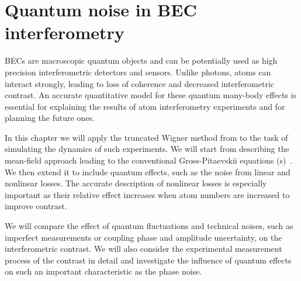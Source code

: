 \chapter{Quantum noise in BEC interferometry}
\label{cha:bec-noise}

BECs are macroscopic quantum objects and can be potentially used as high precision interferometric detectors and sensors.
Unlike photons, atoms can interact strongly, leading to loss of coherence and decreased interferometric contrast.
An accurate quantitative model for these quantum many-body effects is essential for explaining the results of atom interferometry experiments and for planning the future ones.

In this chapter we will apply the truncated Wigner method from  to the task of simulating the dynamics of such experiments.
We will start from describing the mean-field approach leading to the conventional Gross-Pitaevskii equations (s)~\cite{Pitaevskii2003}.
We then extend it to include quantum effects, such as the noise from linear and nonlinear losses.
The accurate description of nonlinear losses is especially important as their relative effect increases when atom numbers are increased to improve contrast.

We will compare the effect of quantum fluctuations and technical noises, such as imperfect measurements or coupling phase and amplitude uncertainty, on the interferometric contrast.
We will also consider the experimental measurement process of the contrast in detail and investigate the influence of quantum effects on such an important characteristic as the phase noise.







